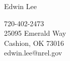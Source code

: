 \documentclass{res} %
\begin{document}

\begin{multicols}{2}
	{\Huge {Edwin Lee}}
	\vfill
	\columnbreak
	\begin{flushright}
		{720-402-2473}\\	
		{25095 Emerald Way}\\
		{Cashion, OK  73016}\\
		{edwin.lee@nrel.gov}
	\end{flushright}
\end{multicols}
\vspace{-0.45in}
\hrulefill
\vspace{-0.2in}
\end{document}
